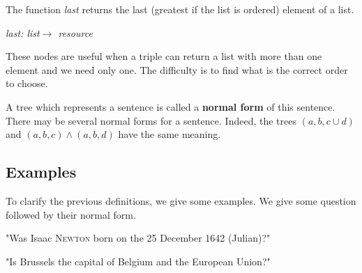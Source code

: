The function \textsl{last} returns the last (greatest if the list is ordered) element of a list.

\begin{center}
\textsl{last: list$\rightarrow$ resource}
\end{center}

These nodes are useful when a triple can return a list with more than one element and we need only one. The difficulty is to find what is the correct order to choose.

\bigskip

A tree which represents a sentence is called a 
{\bf normal form} of this sentence. There may be several normal forms for a sentence. Indeed, the trees $(a,b,c\cup d)$ and $(a,b,c)\wedge(a,b,d)$ have the same meaning.

\subsection{Examples}

To clarify the previous definitions, we give some examples. We give some question followed by their normal form.

\FloatBarrier
\bigskip

"Was Isaac \textsc{Newton} born on the 25 December 1642 (Julian)?"

\begin{figure}[!ht]
    \centering
\end{figure}

\FloatBarrier
\bigskip

"Is Brussels the capital of Belgium and the European Union?"

